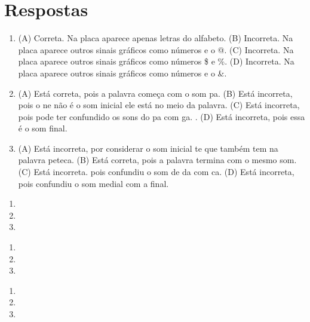 \chapter{Respostas}
\pagestyle{plain}
\footnotesize

\pagecolor{gray!40}


\begin{enumerate}
\item
(A) Correta. Na placa aparece apenas letras do alfabeto.
(B) Incorreta. Na placa aparece outros sinais gráficos como números e o @.
(C) Incorreta. Na placa aparece outros sinais gráficos como números \$ e \%.
(D) Incorreta. Na placa aparece outros sinais gráficos como números e o \&.

\item
(A) Está correta, pois a palavra começa com o som pa.
(B) Está incorreta, pois o ne não é o som inicial ele está no meio da palavra.
(C) Está incorreta, pois pode ter confundido os sons do pa com ga. .
(D) Está incorreta, pois essa é o som final.

\item
(A) Está incorreta, por considerar o som inicial te que também tem na palavra peteca.
(B) Está correta, pois a palavra termina com o mesmo som.
(C) Está incorreta. pois confundiu o som de da com ca.
(D) Está incorreta, pois confundiu o som medial com a final.
\end{enumerate}


\begin{enumerate}
\item

\item

\item
\end{enumerate}


\begin{enumerate}
\item

\item

\item
\end{enumerate}


\begin{enumerate}
\item

\item

\item
\end{enumerate}

